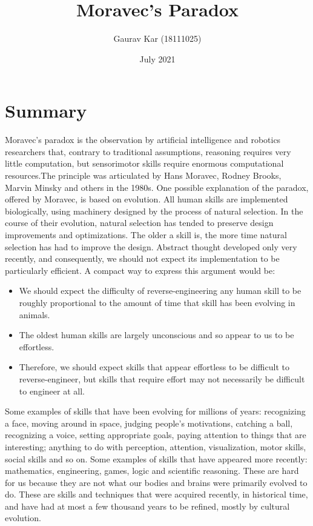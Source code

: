 \documentclass{article}
\title{Moravec's Paradox}
\author{Gaurav Kar (18111025)}
\date{July 2021}
\begin{document}
\maketitle

\section{Summary}
Moravec's paradox is the observation by artificial intelligence and robotics researchers that, contrary to traditional assumptions, reasoning requires very little computation, but sensorimotor skills require enormous computational resources.The principle was articulated by Hans Moravec, Rodney Brooks, Marvin Minsky and others in the 1980s. One possible explanation of the paradox, offered by Moravec, is based on evolution. All human skills are implemented biologically, using machinery designed by the process of natural selection. In the course of their evolution, natural selection has tended to preserve design improvements and optimizations. The older a skill is, the more time natural selection has had to improve the design. Abstract thought developed only very recently, and consequently, we should not expect its implementation to be particularly efficient.
A compact way to express this argument would be:
\begin{itemize}
    \item We should expect the difficulty of reverse-engineering any human skill to be roughly proportional to the amount of time that skill has been evolving in animals.
\end{itemize}
\begin{itemize}
       \item The oldest human skills are largely unconscious and so appear to us to be effortless.
\end{itemize}
\begin{itemize}
    \item Therefore, we should expect skills that appear effortless to be difficult to reverse-engineer, but skills that require effort may not necessarily be difficult to engineer at all.
\end{itemize}
Some examples of skills that have been evolving for millions of years: recognizing a face, moving around in space, judging people's motivations, catching a ball, recognizing a voice, setting appropriate goals, paying attention to things that are interesting; anything to do with perception, attention, visualization, motor skills, social skills and so on.
Some examples of skills that have appeared more recently: mathematics, engineering, games, logic and scientific reasoning. These are hard for us because they are not what our bodies and brains were primarily evolved to do. These are skills and techniques that were acquired recently, in historical time, and have had at most a few thousand years to be refined, mostly by cultural evolution.
\end{document}
